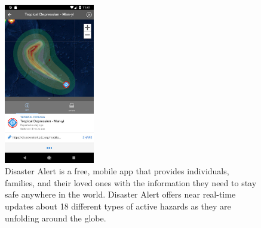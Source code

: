 \documentclass{scrreprt}
\begin{document}
   
\begin{figure}[ht!]
    \centering
    \includegraphics[height=7cm]{appImages/DA1.jpg}
    \caption[Disaster Alert\textsuperscript{\texttrademark}]{Disaster Alert is a free, mobile app that provides individuals, families, and their loved ones with the information they need to stay safe anywhere in the world. Disaster Alert offers near real-time updates about 18 different types of active hazards as they are unfolding around the globe.}
    \label{fig:app2}
\end{figure}




\end{document}
